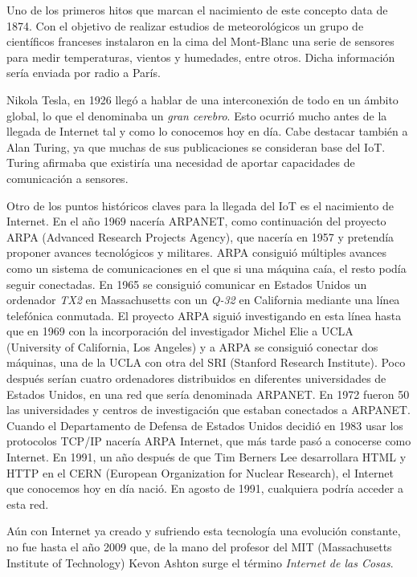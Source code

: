\documentclass[a4paper, 12pt, oneside]{book}
\begin{document}
Uno de los primeros hitos que marcan el nacimiento de este concepto data de 1874. Con el objetivo de realizar estudios de meteorológicos un grupo de científicos franceses instalaron en la cima del Mont-Blanc una serie de sensores para medir temperaturas, vientos y humedades, entre otros. Dicha información sería enviada por radio a París. \cite{www.google.com}

Nikola Tesla, en 1926 llegó a hablar de una interconexión de todo en un ámbito global, lo que el denominaba un \textit{gran cerebro}. Esto ocurrió mucho antes de la llegada de Internet tal y como lo conocemos hoy en día. Cabe destacar también a Alan Turing, ya que muchas de sus publicaciones se consideran base del IoT.  Turing afirmaba que existiría una necesidad de aportar capacidades de comunicación a sensores.

Otro de los puntos históricos claves para la llegada del IoT es el nacimiento de Internet. En el año 1969 nacería ARPANET, como continuación del proyecto ARPA (Advanced Research Projects Agency), que nacería en 1957 y  pretendía proponer avances tecnológicos y militares. ARPA consiguió múltiples avances como un sistema de comunicaciones en el que si una máquina caía, el resto podía seguir conectadas. 
En 1965 se consiguió comunicar en Estados Unidos un ordenador \textit{TX2} en Massachusetts con un \textit{Q-32} en California mediante una línea telefónica conmutada.
El proyecto ARPA siguió investigando en esta línea hasta que en 1969 con la incorporación del investigador Michel Elie a UCLA (University of California, Los Angeles) y a ARPA se consiguió conectar dos máquinas, una de la UCLA con otra del SRI (Stanford Research Institute). Poco después serían cuatro ordenadores distribuidos en diferentes universidades de Estados Unidos, en una red que sería denominada ARPANET.
En 1972 fueron 50 las universidades y centros de investigación que estaban conectados a ARPANET.
Cuando el Departamento de Defensa de Estados Unidos decidió en 1983 usar los protocolos TCP/IP nacería ARPA Internet, que más tarde pasó a conocerse como Internet. En 1991, un año después de que Tim Berners Lee desarrollara HTML y HTTP en el CERN (European Organization for Nuclear Research), el Internet que conocemos hoy en día nació. En agosto de 1991, cualquiera podría acceder a esta red.

Aún con Internet ya creado y sufriendo esta tecnología una evolución constante, no fue hasta el año 2009 que, de la mano del profesor del MIT (Massachusetts Institute of Technology) Kevon Ashton surge el término \textit{Internet de las Cosas}.
\end{document}
